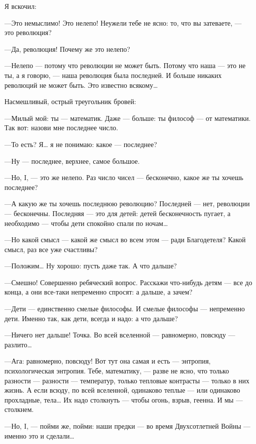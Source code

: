 \documentclass[11pt,openany]{book}
\begin{document}
Я вскочил:

---Это немыслимо! Это нелепо! Неужели тебе не ясно: то, что вы затеваете, --- это революция?

---Да, революция! Почему же это нелепо?

---Нелепо --- потому что революции не может быть. Потому что наша --- это не ты, а я говорю, --- наша революция была последней. И больше никаких революций не может быть. Это известно всякому\ldots{}

Насмешливый, острый треугольник бровей:

---Милый мой: ты --- математик. Даже --- больше: ты философ --- от математики. Так вот: назови мне последнее число.

---То есть? Я\ldots{} я не понимаю: какое --- последнее?

---Ну --- последнее, верхнее, самое большое.

---Но, I, --- это же нелепо. Раз число чисел --- бесконечно, какое же ты хочешь последнее?

---А какую же ты хочешь последнюю революцию? Последней --- нет, революции --- бесконечны. Последняя --- это для детей: детей бесконечность пугает, а необходимо --- чтобы дети спокойно спали по ночам\ldots{}

---Но какой смысл --- какой же смысл во всем этом --- ради Благодетеля? Какой смысл, раз все уже счастливы?

---Положим\ldots{} Ну хорошо: пусть даже так. А что дальше?

---Смешно! Совершенно ребяческий вопрос. Расскажи что-нибудь детям --- все до конца, а они все-таки непременно спросят: а дальше, а зачем?

---Дети --- единственно смелые философы. И смелые философы --- непременно дети. Именно так, как дети, всегда и надо: а что дальше?

---Ничего нет дальше! Точка. Во всей вселенной --- равномерно, повсюду --- разлито\ldots{}

---Ага: равномерно, повсюду! Вот тут она самая и есть --- энтропия, психологическая энтропия. Тебе, математику, --- разве не ясно, что только разности --- разности --- температур, только тепловые контрасты --- только в них жизнь. А если всюду, по всей вселенной, одинаково теплые --- или одинаково прохладные, тела\ldots{} Их надо столкнуть --- чтобы огонь, взрыв, геенна. И мы --- столкнем.

---Но, I, --- пойми же, пойми: наши предки --- во время Двухсотлетней Войны --- именно это и сделали\ldots{}
\end{document}
